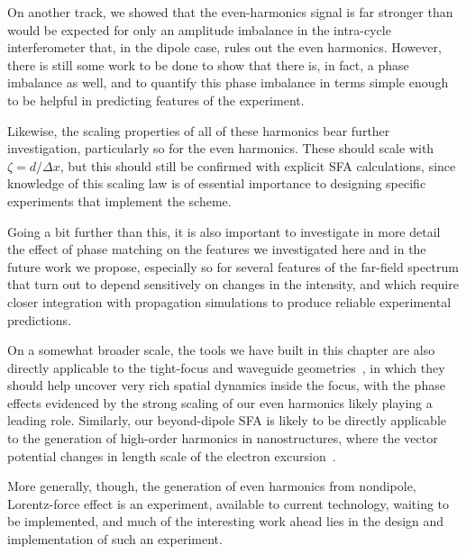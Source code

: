 On another track, we showed that the even-harmonics signal is far stronger than would be expected for only an amplitude imbalance in the intra-cycle interferometer that, in the dipole case, rules out the even harmonics. However, there is still some work to be done to show that there is, in fact, a phase imbalance as well, and to quantify this phase imbalance in terms simple enough to be helpful in predicting features of the experiment. 

Likewise, the scaling properties of all of these harmonics bear further investigation, particularly so for the even harmonics. These should scale with $\zeta = d/\Delta x$, but this should still be confirmed with explicit SFA calculations, since knowledge of this scaling law is of essential importance to designing specific experiments that implement the scheme.

Going a bit further than this, it is also important to investigate in more detail the effect of phase matching on the features we investigated here and in the future work we propose, especially so for several features of the far-field spectrum that turn out to depend sensitively on changes in the intensity, and which require closer integration with propagation simulations to produce reliable experimental predictions.

On a somewhat broader scale, the tools we have built in this chapter are also directly applicable to the tight-focus and waveguide geometries~\cite{ galloway_lorentz_2016}, in which they should help uncover very rich spatial dynamics inside the focus, with the phase effects evidenced by the strong scaling of our even harmonics likely playing a leading role. Similarly, our beyond-dipole SFA is likely to be directly applicable to the generation of high-order harmonics in nanostructures, where the vector potential changes in length scale of the electron excursion~\cite{chacon_hhg-plasmonic_2015, ciappina_attosecond-nanoscale_2016}.

More generally, though, the generation of even harmonics from nondipole, Lorentz-force effect is an experiment, available to current technology, waiting to be implemented, and much of the interesting work ahead lies in the design and implementation of such an experiment.














































